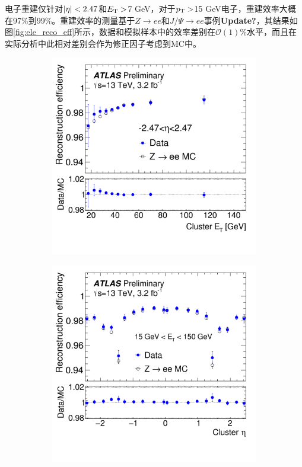 电子重建仅针对$|\eta|<2.47$和$E_{\text{T}} >$7 GeV，对于$p_{\text{T}}>$15 GeV电子，重建效率大概在97\%到99\%。重建效率的测量基于$Z\rightarrow ee$和$J/\Psi\rightarrow ee$事例\cite{ATLAS-CONF-2016-024}\textbf{Update?}，其结果如图\ref{fig:ele_reco_eff}所示，数据和模拟样本中的效率差别在$\mathcal{O}(1)\%$水平，而且在实际分析中此相对差别会作为修正因子考虑到MC中。
\begin{figure}[h]
\begin{center}
\begin{subfigure}[b]{0.45\textwidth}
\centering
      \includegraphics[width=\textwidth]{fig/ele_reco_eff.png}
     \caption{}
      \label{fig:ele_reco_pt_eff}
  \end{subfigure}
 \begin{subfigure}[b]{0.45\textwidth}
 \centering
      \includegraphics[width=\textwidth]{fig/ele_reco_eta_eff.png}

\end{subfigure}
\end{center}
\end{figure}
